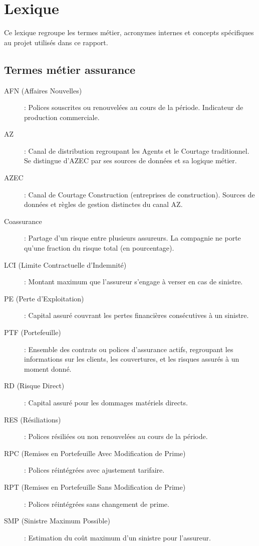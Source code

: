 \chapter*{Lexique}

Ce lexique regroupe les termes métier, acronymes internes et concepts spécifiques au projet utilisés dans ce rapport.

\vspace{0.5cm}

\section*{Termes métier assurance}

\begin{description}
    \item[AFN (Affaires Nouvelles)] : Polices souscrites ou renouvelées au cours de la période. Indicateur de production commerciale.
    \item[AZ] : Canal de distribution regroupant les Agents et le Courtage traditionnel. Se distingue d'AZEC par ses sources de données et sa logique métier.
    \item[AZEC] : Canal de Courtage Construction (entreprises de construction). Sources de données et règles de gestion distinctes du canal AZ.
    \item[Coassurance] : Partage d'un risque entre plusieurs assureurs. La compagnie ne porte qu'une fraction du risque total (en pourcentage).
    \item[LCI (Limite Contractuelle d'Indemnité)] : Montant maximum que l'assureur s'engage à verser en cas de sinistre.
    \item[PE (Perte d'Exploitation)] : Capital assuré couvrant les pertes financières consécutives à un sinistre.
    \item[PTF (Portefeuille)] : Ensemble des contrats ou polices d'assurance actifs, regroupant les informations sur les clients, les couvertures, et les risques assurés à un moment donné.
    \item[RD (Risque Direct)] : Capital assuré pour les dommages matériels directs.
    \item[RES (Résiliations)] : Polices résiliées ou non renouvelées au cours de la période.
    \item[RPC (Remises en Portefeuille Avec Modification de Prime)] : Polices réintégrées avec ajustement tarifaire.
    \item[RPT (Remises en Portefeuille Sans Modification de Prime)] : Polices réintégrées sans changement de prime.
    \item[SMP (Sinistre Maximum Possible)] : Estimation du coût maximum d'un sinistre pour l'assureur.
\end{description}

